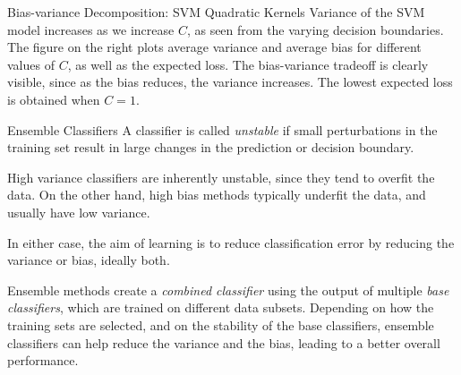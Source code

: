 \begin{frame}[fragile]{Bias-variance Decomposition: SVM Quadratic Kernels}
\small
Variance of the SVM model increases as we increase $C$, as seen
from the varying decision boundaries. The figure on the right plots
average variance and average bias for different values of $C$, as well
as the expected loss. The bias-variance tradeoff is clearly visible,
since as the bias reduces, the variance increases.  The lowest expected
loss is obtained when $C=1$.
\end{frame}



\begin{frame}{Ensemble Classif\/{i}ers}
A classif\/{i}er is called {\em unstable} if small perturbations in the
training set result in large changes in the prediction or decision
boundary. 

\medskip
High variance classif\/{i}ers are inherently unstable, since they
tend to overf\/{i}t the data.
On the other hand, high bias methods typically underf\/{i}t the data, and usually have
low variance.

\medskip
In either case, the aim of learning is to reduce classif\/{i}cation
error by reducing the variance or bias, ideally both.

\medskip
Ensemble methods create a {\em combined classif\/{i}er} using the
output of multiple {\em base classif\/{i}ers}, which are
trained on different data subsets. Depending on how the training
sets are selected, and on the stability of the base classif\/{i}ers,
ensemble classif\/{i}ers can help reduce the variance and the bias, leading
to a better overall performance.
\end{frame}



